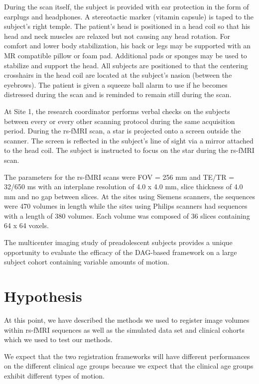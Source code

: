During the scan itself, the subject is provided with ear protection in the form of earplugs and headphones. A stereotactic marker (vitamin capsule) is taped to the subject's right temple. The patient's head is positioned in a head coil so that his head and neck muscles are relaxed but not causing any head rotation. For comfort and lower body stabilization, his back or legs may be supported with an MR compatible pillow or foam pad. Additional pads or sponges may be used to stabilize and support the head. All subjects are positioned to that the centering crosshairs in the head coil are located at the subject's nasion (between the eyebrows). The patient is given a squeeze ball alarm to use if he becomes distressed during the scan and is reminded to remain still during the scan. 

At Site 1, the research coordinator performs verbal checks on the subjects between every or every other scanning protocol during the same acquisition period. During the rs-fMRI scan, a star is projected onto a screen outside the scanner. The screen is reflected in the subject's line of sight via a mirror attached to the head coil. The subject is instructed to focus on the star during the rs-fMRI scan.

The parameters for the rs-fMRI scans were FOV = 256 mm and TE/TR = 32/650 ms with an interplane resolution of 4.0 x 4.0 mm, slice thickness of 4.0 mm and no gap between slices. At the sites using Siemens scanners, the sequences were 470 volumes in length while the sites using Philips scanners had sequences with a length of 380 volumes. Each volume was composed of 36 slices containing 64 x 64 voxels.

The multicenter imaging study of preadolescent subjects provides a unique opportunity to evaluate the efficacy of the DAG-based framework on a large subject cohort containing variable amounts of motion. %

\section{Hypothesis}

At this point, we have described the methods we used to register image volumes within rs-fMRI sequences as well as the simulated data set and clinical cohorts which we used to test our methods. 

We expect that the two registration frameworks will have different performances on the different clinical age groups because we expect that the clinical age groups exhibit different types of motion. 

